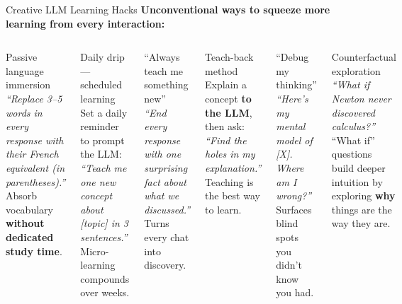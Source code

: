 \documentclass[aspectratio=169]{beamer}
\begin{document}
\begin{frame}{Creative LLM Learning Hacks}
\footnotesize
\textbf{\color{popblue}Unconventional ways to squeeze more learning from every interaction:}

\smallskip
\begin{columns}[T]
\begin{block}{Passive language immersion}
\textit{``Replace 3--5 words in every response with their French equivalent (in parentheses).''} Absorb vocabulary \textbf{without dedicated study time}.
\end{block}

\begin{block}{Daily drip --- scheduled learning}
Set a daily reminder to prompt the LLM:
\textit{``Teach me one new concept about [topic] in 3 sentences.''} Micro-learning compounds over weeks.
\end{block}

\begin{block}{``Always teach me something new''}
\textit{``End every response with one surprising fact about what we discussed.''} Turns every chat into discovery.
\end{block}

\begin{block}{Teach-back method}
Explain a concept \textbf{to the LLM}, then ask:
\textit{``Find the holes in my explanation.''} Teaching is the best way to learn.
\end{block}

\begin{block}{``Debug my thinking''}
\textit{``Here's my mental model of [X]. Where am I wrong?''} Surfaces blind spots you didn't know you had.
\end{block}

\begin{block}{Counterfactual exploration}
\textit{``What if Newton never discovered calculus?''} ``What if'' questions build deeper intuition by exploring \textbf{why} things are the way they are.
\end{block}
\end{columns}
\end{frame}
\end{document}

